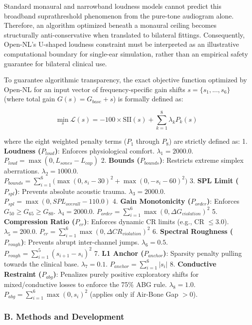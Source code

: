 \documentclass[
  12pt,
]{article}
\begin{document}
Standard monaural and narrowband loudness models cannot predict this
broadband suprathreshold phenomenon from the pure-tone audiogram alone.
Therefore, an algorithm optimized beneath a monaural ceiling becomes
structurally anti-conservative when translated to bilateral fittings.
Consequently, Open-NL's U-shaped loudness constraint must be interpreted
as an illustrative computational boundary for single-ear simulation,
rather than an empirical safety guarantee for bilateral clinical use.

To guarantee algorithmic transparency, the exact objective function
optimized by Open-NL for an input vector of frequency-specific gain
shifts \(s = \{s_1, ..., s_6\}\) (where total gain
\(G(s) = G_{base} + s\)) is formally defined as:

\[
\min_{s} \mathcal{L}(s) = -100 \times \text{SII}(s) + \sum_{k=1}^{8} \lambda_k P_k(s)
\]

where the eight weighted penalty terms (\(P_1\) through \(P_8\)) are
strictly defined as: 1. \textbf{Loudness (\(P_{loud}\))}: Enforces
physiological comfort. \(\lambda_1 = 2000.0\).
\(P_{loud} = \max(0, L_{sones} - L_{cap})\) 2. \textbf{Bounds
(\(P_{bounds}\))}: Restricts extreme simplex aberrations.
\(\lambda_2 = 1000.0\).
\(P_{bounds} = \sum_{i=1}^6 \big( \max(0, s_i - 30)^2 + \max(0, -s_i - 60)^2 \big)\)
3. \textbf{SPL Limit (\(P_{spl}\))}: Prevents absolute acoustic trauma.
\(\lambda_3 = 2000.0\). \(P_{spl} = \max(0, SPL_{overall} - 110.0)\) 4.
\textbf{Gain Monotonicity (\(P_{order}\))}: Enforces
\(G_{50} \ge G_{65} \ge G_{80}\). \(\lambda_4 = 2000.0\).
\(P_{order} = \sum_{i=1}^6 \max(0, \Delta G_{violation})^2\) 5.
\textbf{Compression Ratio (\(P_{cr}\))}: Enforces dynamic CR limits
(e.g., CR \(\le 3.0\)). \(\lambda_5 = 200.0\).
\(P_{cr} = \sum_{i=1}^6 \max(0, \Delta CR_{violation})^2\) 6.
\textbf{Spectral Roughness (\(P_{rough}\))}: Prevents abrupt
inter-channel jumps. \(\lambda_6 = 0.5\).
\(P_{rough} = \sum_{i=1}^5 (s_{i+1} - s_i)^2\) 7. \textbf{L1 Anchor
(\(P_{anchor}\))}: Sparsity penalty pulling towards the clinical base.
\(\lambda_7 = 0.1\). \(P_{anchor} = \sum_{i=1}^6 |s_i|\) 8.
\textbf{Conductive Restraint (\(P_{abg}\))}: Penalizes purely positive
exploratory shifts for mixed/conductive losses to enforce the 75\% ABG
rule. \(\lambda_8 = 1.0\). \(P_{abg} = \sum_{i=1}^6 \max(0, s_i)^2\)
(applies only if Air-Bone Gap \(> 0\)).

\subsubsection{B. Methods and
Development}\label{b.-methods-and-development}
\end{document}
